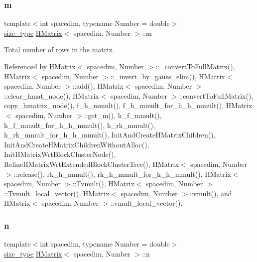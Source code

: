 \mbox{\label{classHMatrix_aa5523463043e4d542eae17d262bd22ad}} 
\subsubsection{\texorpdfstring{m}{m}}
{\footnotesize\ttfamily template$<$int spacedim, typename Number = double$>$ \\
\hyperlink{classHMatrix_a5ca8dc549783d38371a01ecd621ecb34}{size\+\_\+type} \hyperlink{classHMatrix}{H\+Matrix}$<$ spacedim, Number $>$\+::m\hspace{0.3cm}{\ttfamily [private]}}

Total number of rows in the matrix. 

Referenced by H\+Matrix$<$ spacedim, Number $>$\+::\+\_\+convert\+To\+Full\+Matrix(), H\+Matrix$<$ spacedim, Number $>$\+::\+\_\+invert\+\_\+by\+\_\+gauss\+\_\+elim(), H\+Matrix$<$ spacedim, Number $>$\+::add(), H\+Matrix$<$ spacedim, Number $>$\+::clear\+\_\+hmat\+\_\+node(), H\+Matrix$<$ spacedim, Number $>$\+::convert\+To\+Full\+Matrix(), copy\+\_\+hmatrix\+\_\+node(), f\+\_\+h\+\_\+mmult(), f\+\_\+h\+\_\+mmult\+\_\+for\+\_\+h\+\_\+h\+\_\+mmult(), H\+Matrix$<$ spacedim, Number $>$\+::get\+\_\+m(), h\+\_\+f\+\_\+mmult(), h\+\_\+f\+\_\+mmult\+\_\+for\+\_\+h\+\_\+h\+\_\+mmult(), h\+\_\+rk\+\_\+mmult(), h\+\_\+rk\+\_\+mmult\+\_\+for\+\_\+h\+\_\+h\+\_\+mmult(), Init\+And\+Create\+H\+Matrix\+Children(), Init\+And\+Create\+H\+Matrix\+Children\+Without\+Alloc(), Init\+H\+Matrix\+Wrt\+Block\+Cluster\+Node(), Refine\+H\+Matrix\+Wrt\+Extended\+Block\+Cluster\+Tree(), H\+Matrix$<$ spacedim, Number $>$\+::release(), rk\+\_\+h\+\_\+mmult(), rk\+\_\+h\+\_\+mmult\+\_\+for\+\_\+h\+\_\+h\+\_\+mmult(), H\+Matrix$<$ spacedim, Number $>$\+::\+Tvmult(), H\+Matrix$<$ spacedim, Number $>$\+::\+Tvmult\+\_\+local\+\_\+vector(), H\+Matrix$<$ spacedim, Number $>$\+::vmult(), and H\+Matrix$<$ spacedim, Number $>$\+::vmult\+\_\+local\+\_\+vector().

\mbox{\label{classHMatrix_ab5ae2eb472f81f80653ed4411629c2d1}} 
\subsubsection{\texorpdfstring{n}{n}}
{\footnotesize\ttfamily template$<$int spacedim, typename Number = double$>$ \\
\hyperlink{classHMatrix_a5ca8dc549783d38371a01ecd621ecb34}{size\+\_\+type} \hyperlink{classHMatrix}{H\+Matrix}$<$ spacedim, Number $>$\+::n\hspace{0.3cm}{\ttfamily [private]}}

